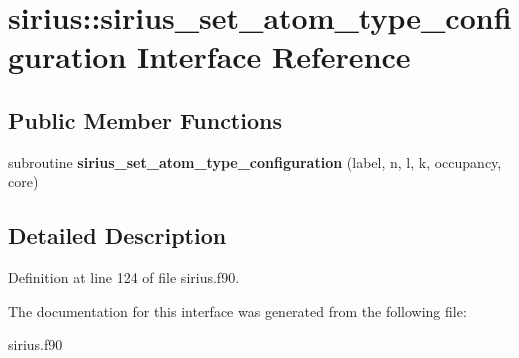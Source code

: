 \hypertarget{interfacesirius_1_1sirius__set__atom__type__configuration}{}\section{sirius\+:\+:sirius\+\_\+set\+\_\+atom\+\_\+type\+\_\+configuration Interface Reference}
\label{interfacesirius_1_1sirius__set__atom__type__configuration}
\subsection*{Public Member Functions}
\begin{DoxyCompactItemize}
\item 
\hypertarget{interfacesirius_1_1sirius__set__atom__type__configuration_a0dfef96ad057362a016bc052d2b8a376}{}subroutine {\bfseries sirius\+\_\+set\+\_\+atom\+\_\+type\+\_\+configuration} (label, n, l, k, occupancy, core)\label{interfacesirius_1_1sirius__set__atom__type__configuration_a0dfef96ad057362a016bc052d2b8a376}

\end{DoxyCompactItemize}


\subsection{Detailed Description}


Definition at line 124 of file sirius.\+f90.



The documentation for this interface was generated from the following file\+:\begin{DoxyCompactItemize}
\item 
sirius.\+f90\end{DoxyCompactItemize}
